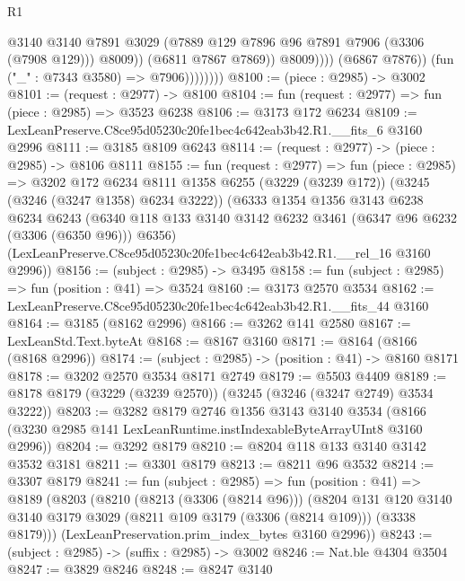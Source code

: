 \begin{lexlean}{R1}
\begin{coremodule}
                                  @3140
                                  @3140
                                  @7891
                                  @3029
                                  (@7889 @129 @7896 @96 @7891 @7906 (@3306 (@7908 @129)))
                                  @8009))
                              (@6811 @7867 @7869))
                            @8009))))
                    (@6867 @7876))
                  (fun ("_" : @7343 @3580) => @7906))))))))
@8100 := (piece : @2985) -> @3002
@8101 := (request : @2977) -> @8100
@8104 := fun (request : @2977) => fun (piece : @2985) => @3523 @6238
@8106 := @3173 @172 @6234
@8109 := LexLeanPreserve.C8ce95d05230c20fe1bec4c642eab3b42.R1.__fits_6 @3160 @2996
@8111 := @3185 @8109 @6243
@8114 := (request : @2977) -> (piece : @2985) -> @8106 @8111
@8155 := fun (request : @2977) =>
  fun (piece : @2985) =>
  @3202
    @172
    @6234
    @8111
    @1358
    @6255
    (@3229 (@3239 @172))
    (@3245 (@3246 (@3247 @1358) @6234 @3222))
    (@6333
      @1354
      @1356
      @3143
      @6238
      @6234
      @6243
      (@6340 @118 @133 @3140 @3142 @6232 @3461 (@6347 @96 @6232 (@3306 (@6350 @96))) @6356)
      (LexLeanPreserve.C8ce95d05230c20fe1bec4c642eab3b42.R1.__rel_16 @3160 @2996))
@8156 := (subject : @2985) -> @3495
@8158 := fun (subject : @2985) => fun (position : @41) => @3524
@8160 := @3173 @2570 @3534
@8162 := LexLeanPreserve.C8ce95d05230c20fe1bec4c642eab3b42.R1.__fits_44 @3160
@8164 := @3185 (@8162 @2996)
@8166 := @3262 @141 @2580
@8167 := LexLeanStd.Text.byteAt
@8168 := @8167 @3160
@8171 := @8164 (@8166 (@8168 @2996))
@8174 := (subject : @2985) -> (position : @41) -> @8160 @8171
@8178 := @3202 @2570 @3534 @8171 @2749
@8179 := @5503 @4409
@8189 := @8178 @8179 (@3229 (@3239 @2570)) (@3245 (@3246 (@3247 @2749) @3534 @3222))
@8203 := @3282
    @8179
    @2746
    @1356
    @3143
    @3140
    @3534
    (@8166 (@3230 @2985 @141 LexLeanRuntime.instIndexableByteArrayUInt8 @3160 @2996))
@8204 := @3292 @8179
@8210 := @8204 @118 @133 @3140 @3142 @3532 @3181
@8211 := @3301 @8179
@8213 := @8211 @96 @3532
@8214 := @3307 @8179
@8241 := fun (subject : @2985) =>
  fun (position : @41) =>
  @8189
    (@8203
      (@8210
        (@8213 (@3306 (@8214 @96)))
        (@8204
          @131
          @120
          @3140
          @3140
          @3179
          @3029
          (@8211 @109 @3179 (@3306 (@8214 @109)))
          (@3338 @8179)))
      (LexLeanPreservation.prim_index_bytes @3160 @2996))
@8243 := (subject : @2985) -> (suffix : @2985) -> @3002
@8246 := Nat.ble @4304 @3504
@8247 := @3829 @8246
@8248 := @8247 @3140

\end{coremodule}
\end{lexlean}
